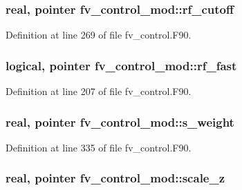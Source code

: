 \subsubsection[{rf\-\_\-cutoff}]{\setlength{\rightskip}{0pt plus 5cm}real, pointer fv\-\_\-control\-\_\-mod\-::rf\-\_\-cutoff\hspace{0.3cm}{\ttfamily [private]}}\label{classfv__control__mod_a2815e52e7b4af1a6e5fa34d99ad9d7cc}


Definition at line 269 of file fv\-\_\-control.\-F90.

\subsubsection[{rf\-\_\-fast}]{\setlength{\rightskip}{0pt plus 5cm}logical, pointer fv\-\_\-control\-\_\-mod\-::rf\-\_\-fast\hspace{0.3cm}{\ttfamily [private]}}\label{classfv__control__mod_ac25e0b8133cbc74acdfffc12de4ef035}


Definition at line 207 of file fv\-\_\-control.\-F90.

\subsubsection[{s\-\_\-weight}]{\setlength{\rightskip}{0pt plus 5cm}real, pointer fv\-\_\-control\-\_\-mod\-::s\-\_\-weight\hspace{0.3cm}{\ttfamily [private]}}\label{classfv__control__mod_a84710a8f70995d6c5c2436471f516d19}


Definition at line 335 of file fv\-\_\-control.\-F90.

\subsubsection[{scale\-\_\-z}]{\setlength{\rightskip}{0pt plus 5cm}real, pointer fv\-\_\-control\-\_\-mod\-::scale\-\_\-z\hspace{0.3cm}{\ttfamily [private]}}\label{classfv__control__mod_a33331d1b80f42ac121c7e433ce110e4f}


